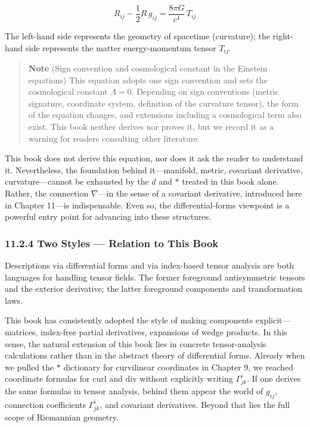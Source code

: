 \[R_{ij} - \frac{1}{2}R\,g_{ij} = \frac{8\pi G}{c^4}\,T_{ij}\]

The left-hand side represents the geometry of spacetime (curvature); the
right-hand side represents the matter energy-momentum tensor \(T_{ij}\).

\begin{quote}
\textbf{Note} (Sign convention and cosmological constant in the Einstein
equations) This equation adopts one sign convention and sets the
cosmological constant \(\Lambda = 0\). Depending on sign conventions
(metric signature, coordinate system, definition of the curvature
tensor), the form of the equation changes, and extensions including a
cosmological term also exist. This book neither derives nor proves it,
but we record it as a warning for readers consulting other literature.
\end{quote}

This book does not derive this equation, nor does it ask the reader to
understand it. Nevertheless, the foundation behind it---manifold,
metric, covariant derivative, curvature---cannot be exhausted by the
\(d\) and \(\ast\) treated in this book alone. Rather, the connection
\(\nabla\)---in the sense of a covariant derivative, introduced here in
Chapter 11---is indispensable. Even so, the differential-forms viewpoint
is a powerful entry point for advancing into these structures.

\hypertarget{two-styles-relation-to-this-book}{%
\subsubsection{11.2.4 Two Styles --- Relation to This
Book}\label{two-styles-relation-to-this-book}}

Descriptions via differential forms and via index-based tensor analysis
are both languages for handling tensor fields. The former foreground
antisymmetric tensors and the exterior derivative; the latter foreground
components and transformation laws.

This book has consistently adopted the style of making components
explicit---matrices, index-free partial derivatives, expansions of wedge
products. In this sense, the natural extension of this book lies in
concrete tensor-analysis calculations rather than in the abstract theory
of differential forms. Already when we pulled the \(\ast\) dictionary
for curvilinear coordinates in Chapter 9, we reached coordinate formulas
for \(\mathrm{curl}\) and \(\mathrm{div}\) without explicitly writing
\(\Gamma^i_{jk}\). If one derives the same formulas in tensor analysis,
behind them appear the world of \(g_{ij}\), connection coefficients
\(\Gamma^i_{jk}\), and covariant derivatives. Beyond that lies the full
scope of Riemannian geometry.

